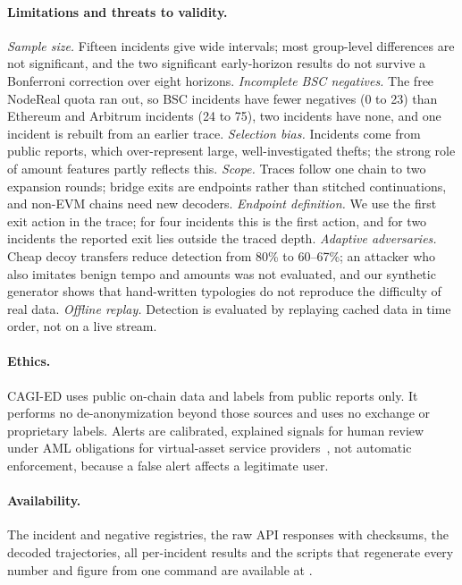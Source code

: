 \paragraph{Limitations and threats to validity.}
\emph{Sample size.} Fifteen incidents give wide intervals; most group-level differences are not significant, and the two significant early-horizon results do not survive a Bonferroni correction over eight horizons.
\emph{Incomplete BSC negatives.} The free NodeReal quota ran out, so BSC incidents have fewer negatives (0 to 23) than Ethereum and Arbitrum incidents (24 to 75), two incidents have none, and one incident is rebuilt from an earlier trace.
\emph{Selection bias.} Incidents come from public reports, which over-represent large, well-investigated thefts; the strong role of amount features partly reflects this.
\emph{Scope.} Traces follow one chain to two expansion rounds; bridge exits are endpoints rather than stitched continuations, and non-EVM chains need new decoders.
\emph{Endpoint definition.} We use the first exit action in the trace; for four incidents this is the first action, and for two incidents the reported exit lies outside the traced depth.
\emph{Adaptive adversaries.} Cheap decoy transfers reduce detection from 80\% to 60--67\%; an attacker who also imitates benign tempo and amounts was not evaluated, and our synthetic generator shows that hand-written typologies do not reproduce the difficulty of real data.
\emph{Offline replay.} Detection is evaluated by replaying cached data in time order, not on a live stream.

\paragraph{Ethics.}
CAGI-ED uses public on-chain data and labels from public reports only.
It performs no de-anonymization beyond those sources and uses no exchange or proprietary labels.
Alerts are calibrated, explained signals for human review under AML obligations for virtual-asset service providers~\cite{fatf2022targeted}, not automatic enforcement, because a false alert affects a legitimate user.

\paragraph{Availability.}
The incident and negative registries, the raw API responses with checksums, the decoded trajectories, all per-incident results and the scripts that regenerate every number and figure from one command are available at .

